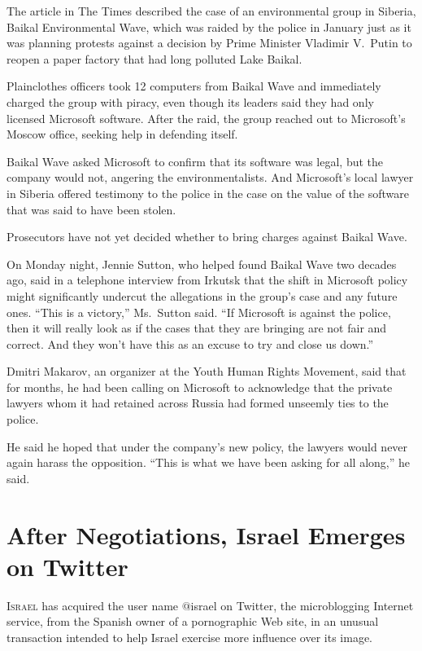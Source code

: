 ﻿\documentclass[12pt]{article}
\begin{document}
The article in The Times described the case of an environmental group in Siberia, Baikal
Environmental Wave, which was raided by the police in January just as it was planning protests
against a decision by Prime Minister Vladimir V.~Putin to reopen a paper factory that had long
polluted Lake Baikal.

Plainclothes officers took 12 computers from Baikal Wave and immediately charged the group with
piracy, even though its leaders said they had only licensed Microsoft software. After the raid, the
group reached out to Microsoft's Moscow office, seeking help in defending itself.

Baikal Wave asked Microsoft to confirm that its software was legal, but the company would not,
angering the environmentalists. And Microsoft's local lawyer in Siberia offered testimony to the
police in the case on the value of the software that was said to have been stolen.

Prosecutors have not yet decided whether to bring charges against Baikal Wave.

On Monday night, Jennie Sutton, who helped found Baikal Wave two decades ago, said in a telephone
interview from Irkutsk that the shift in Microsoft policy might significantly undercut the
allegations in the group's case and any future ones. ``This is a victory,'' Ms.~Sutton said. ``If
Microsoft is against the police, then it will really look as if the cases that they are bringing are
not fair and correct. And they won't have this as an excuse to try and close us down.''

Dmitri Makarov, an organizer at the Youth Human Rights Movement, said that for months, he had been
calling on Microsoft to acknowledge that the private lawyers whom it had retained across Russia had
formed unseemly ties to the police.

He said he hoped that under the company's new policy, the lawyers would never again harass the
opposition. ``This is what we have been asking for all along,'' he said.

\pagebreak
\section{After Negotiations, Israel Emerges on Twitter}

\lettrine{I}{srael} has acquired the user name $@$israel on Twitter, the
microblogging Internet service, from the Spanish owner of a pornographic Web site, in an unusual
transaction intended to help Israel exercise more influence over its image.
\end{document}

